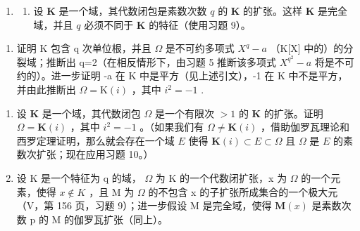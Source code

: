\begin{enumerate}
\def\labelenumi{\arabic{enumi})}
\setcounter{enumi}{9}
\tightlist
\item
  \begin{enumerate}
  \def\labelenumii{\alph{enumii})}
  \tightlist
  \item
    设 \(\mathbf{K}\) 是一个域，其代数闭包是素数次数 \(q\) 的 \(\mathbf{K}\) 的扩张。这样 \(\mathbf{K}\) 是完全域，并且 \(q\) 必须不同于 \(\mathbf{K}\) 的特征（使用习题 9）。
  \end{enumerate}
\end{enumerate}

\begin{enumerate}
\def\labelenumi{\alph{enumi})}
\setcounter{enumi}{1}
\tightlist
\item
  证明 K 包含 q 次单位根，并且 \(\Omega\) 是不可约多项式 \(X^{q}-a\) （K{[}X{]} 中的）的分裂域；推断出 q=2（在相反情形下，由习题 5 推断该多项式 \(X^{q^{2}}-a\) 将是不可约的）。进一步证明 -a 在 K 中是平方（见上述引文），-1 在 K 中不是平方，并由此推断出 \(\Omega=\mathrm{K}(i)\) ，其中 \(i^{2}=-1\) .
\end{enumerate}

\begin{enumerate}
\def\labelenumi{\arabic{enumi})}
\setcounter{enumi}{10}
\item
  设 \(\mathbf{K}\) 是一个域，其代数闭包 \(\Omega\) 是一个有限次 \(> 1\) 的 \(\mathbf{K}\) 的扩张。证明 \(\Omega = \mathbf{K}(i)\) ，其中 \(i^2 = -1\) 。（如果我们有 \(\Omega \neq \mathbf{K}(i)\) ，借助伽罗瓦理论和西罗定理证明，那么就会存在一个域 \(E\) 使得 \(\mathbf{K}(i) \subset E \subset \Omega\) 且 \(\Omega\) 是 \(E\) 的素数次扩张；现在应用习题 10。）
\item
  设 K 是一个特征为 q 的域， \(\Omega\) 为 K 的一个代数闭扩张，x 为 \(\Omega\) 的一个元素，使得 \(x \notin K\) ，且 M 为 \(\Omega\) 的不包含 x 的子扩张所成集合的一个极大元（V，第 156 页，习题 9）；进一步假设 M 是完全域，使得 \(\mathbf{M}(x)\) 是素数次数 p 的 M 的伽罗瓦扩张（同上）。
\end{enumerate}

